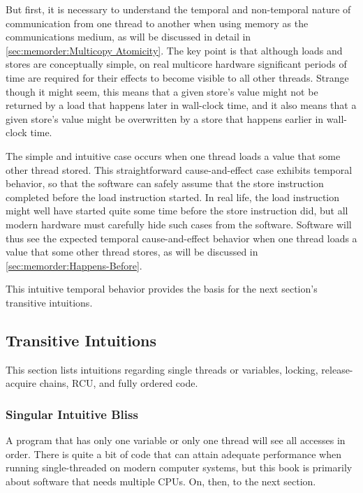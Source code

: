 But first, it is necessary to understand the temporal and non-temporal
nature of communication from one thread to another when using memory
as the communications medium, as will be discussed in detail in
\cref{sec:memorder:Multicopy Atomicity}.
The key point is that although loads and stores are conceptually simple,
on real multicore hardware significant periods of time are required for
their effects to become visible to all other threads.
Strange though it might seem, this means that a given store's value
might not be returned by a load that happens later in wall-clock time,
and it also means that a given store's value might be overwritten by a
store that happens earlier in wall-clock time.

The simple and intuitive case occurs when one thread loads a value that
some other thread stored.
This straightforward cause-and-effect case exhibits temporal behavior, so
that the software can safely assume that the store instruction completed
before the load instruction started.
In real life, the load instruction might well have started quite some
time before the store instruction did, but all modern hardware must
carefully hide such cases from the software.
Software will thus see the expected temporal cause-and-effect
behavior when one thread loads a value that some other thread stores,
as will be discussed in \cref{sec:memorder:Happens-Before}.

This intuitive temporal behavior provides the basis for the next section's
transitive intuitions.

\subsection{Transitive Intuitions}
\label{sec:memorder:Transitive Intuitions}

This section lists intuitions regarding single threads or variables,
locking, release-acquire chains, RCU, and fully ordered code.

\subsubsection{Singular Intuitive Bliss}
\label{sec:memorder:Singular Intuitive Bliss}

A program that has only one variable or only one thread will see
all accesses in order.
There is quite a bit of code that can attain adequate performance
when running single-threaded on modern computer systems, but
this book is primarily about software that needs multiple CPUs.
On, then, to the next section.

